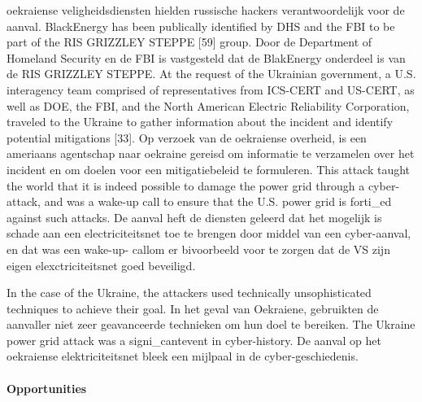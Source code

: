 		oekraiense veligheidsdiensten hielden russische hackers verantwoordelijk voor de aanval.
		BlackEnergy has been publically identified by DHS and the FBI to be part of the RIS
		GRIZZLEY STEPPE
		[59] group. Door de Department of Homeland Security en de FBI is vastgesteld dat de
		BlakEnergy onderdeel is van de RIS GRIZZLEY STEPPE.
		At the request of the Ukrainian government, a U.S. interagency team comprised of
		representatives from ICS-CERT and US-CERT, as well as DOE, the FBI, and the North
		American Electric Reliability Corporation, traveled to the Ukraine to gather information about
		the incident and identify potential mitigations [33]. Op verzoek van de oekraiense overheid, is
		een ameriaans agentschap naar oekraine gereisd om informatie te verzamelen over het
		incident en om doelen voor een mitigatiebeleid te formuleren.
		This attack taught the world that it is indeed possible to damage the power grid through a
		cyber-attack, and was a wake-up call to ensure that the U.S. power grid is forti_ed against
		such attacks. De aanval heft de diensten geleerd dat het mogelijk is schade aan een
		electriciteitsnet toe te brengen door middel van een cyber-aanval, en dat was een wake-up-
		callom er bivoorbeeld voor te zorgen dat de VS zijn eigen elexctriciteitsnet goed beveiligd.
		
		In the case of the Ukraine, the attackers used technically unsophisticated techniques to
		achieve their goal. In het geval van Oekraiene, gebruikten de aanvaller niet zeer
		geavanceerde technieken om hun doel te bereiken.
		The Ukraine power grid attack was a signi_cantevent in cyber-history. De aanval op het
		oekraiense elektriciteitsnet bleek een mijlpaal in de cyber-geschiedenis.
		
		
		\paragraph{Opportunities}
		
